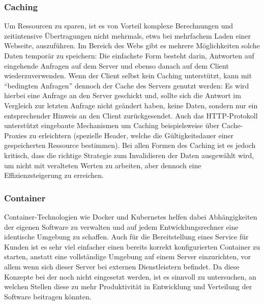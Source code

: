 \subsubsection{Caching}
Um Ressourcen zu sparen, ist es von Vorteil komplexe Berechnungen und zeitintensive Übertragungen nicht mehrmals, etwa bei mehrfachem Laden einer Webseite, auszuführen. Im Bereich des Webs gibt es mehrere Möglichkeiten solche Daten temporär zu speichern: Die einfachste Form besteht darin, Antworten auf eingehende Anfragen auf dem Server und ebenso danach auf dem Client wiederzuverwenden. Wenn der Client selbst kein Caching unterstützt, kann mit ``bedingten Anfragen'' dennoch der Cache des Servers genutzt werden: Es wird hierbei eine Anfrage an den Server geschickt und, sollte sich die Antwort im Vergleich zur letzten Anfrage nicht geändert haben, keine Daten, sondern nur ein entsprechender Hinweis an den Client zurückgesendet. Auch das HTTP-Protokoll unterstützt eingebaute Mechanismen um Caching beispielsweise über Cache-Proxies zu erleichtern (spezielle Header, welche die Gültigkeitsdauer einer gespeicherten Ressource bestimmen). Bei allen Formen des Caching ist es jedoch kritisch, dass die richtige Strategie zum Invalidieren der Daten ausgewählt wird, um nicht mit veralteten Werten zu arbeiten, aber dennoch eine Effizienzsteigerung zu erreichen.

\subsubsection{Container}
Container-Technologien wie Docker und Kubernetes helfen dabei Abhängigkeiten der eigenen Software zu verwalten und auf jedem Entwicklungsrechner eine identische Umgebung zu schaffen. Auch für die Bereitstellung eines Service für Kunden ist es sehr viel einfacher einen bereits korrekt konfigurierten Container zu starten, anstatt eine vollständige Umgebung auf einem Server einzurichten, vor allem wenn sich dieser Server bei externen Dienstleistern befindet. Da diese Konzepte bei der  noch nicht eingesetzt werden, ist es sinnvoll zu untersuchen, an welchen Stellen diese zu mehr Produktivität in Entwicklung und Verteilung der Software beitragen könnten.

